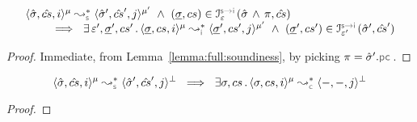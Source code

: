 \begin{lemma}
$$
\begin{array}{l}
\transabssemrule{\sstate, \scs, i}{\sstate', \scs', j}{\mode}{\mode'}{\symbolic}  
    \ \wedge \ (\istate, \cs) \in \interpret{\symbinst}{\senv}(\sstate \, \wedge \, \pc, \scs) \\ \quad \quad 
    \ \implies \ \exists \, \senv', \istate', \cs' \, . \, 
        \transabssemrule{\istate, \cs, i}{\istate', \cs', j}{\mode}{\mode'}{\instrumented}
               \ \wedge \ (\istate', \cs') \in \interpret{\symbinst}{\senv'}(\sstate', \scs')
\end{array}
$$
\end{lemma}
\begin{proof}
Immediate, from Lemma~\ref{lemma:full:soundiness}, by picking $\pc = \sstate'.\pcsel$.
\end{proof}

%
\begin{cormax}
$$
\transabssemrule{\sstate, \scs, i}{\sstate', \scs', j}{\mode}{\bot}{\symbolic}  
      \ \implies \  \exists \jstate, \cs \, . \, \transabssemrule{\jstate, \cs, i}{-, -, j}{\mode}{\bot}{\concrete}  
$$
\end{cormax}
\begin{proof}
%
%
\end{proof}

